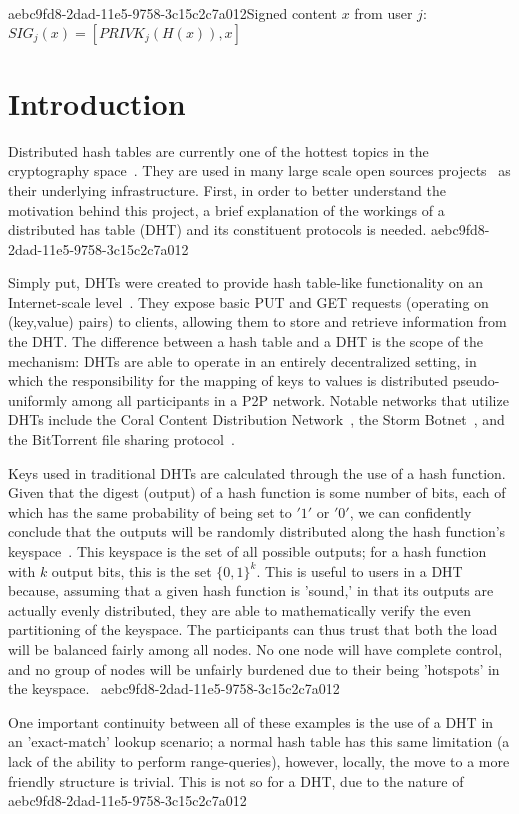 \documentclass[12pt]{article}
\begin{document}
aebc9fd8-2dad-11e5-9758-3c15c2c7a012Signed content $x$ from user $j$: $SIG_j(x) = \left[ PRIVK_j( H(x) ), x \right]$

\section{Introduction}
\par Distributed hash tables are currently one of the hottest topics in the cryptography space~\cite{Stoica:2001dj,Rowstron:2001ea,Ratnasamy:2001wn}. They are used in many large scale open sources projects~\cite{Freitas:2013tb,Xu:2010vs,Perfitt:2010fh} as their underlying infrastructure. First, in order to better understand the motivation behind this project, a brief explanation of the workings of a distributed has table (DHT) and its constituent protocols is needed.
aebc9fd8-2dad-11e5-9758-3c15c2c7a012
\par Simply put, DHTs were created to provide hash table-like functionality on an Internet-scale level~\cite{Ratnasamy:2001wn}. They expose basic PUT and GET requests (operating on (key,value) pairs) to clients, allowing them to store and retrieve information from the DHT. The difference between a hash table and a DHT is the scope of the mechanism: DHTs are able to operate in an entirely decentralized setting, in which the responsibility for the mapping of keys to values is distributed pseudo-uniformly among all participants in a P2P network. Notable networks that utilize DHTs include the Coral Content Distribution Network~\cite{Freedman:2004vb}, the Storm Botnet~\cite{Holz:2008uk}, and the BitTorrent file sharing protocol~\cite{Cohen:y1_8mBnw}.

\par Keys used in traditional DHTs are calculated through the use of a hash function. Given that the digest (output) of a hash function is some number of bits, each of which has the same probability of being set to $'1'$ or $'0'$, we can confidently conclude that the outputs will be randomly distributed along the hash function's keyspace~. This keyspace is the set of all possible outputs; for a hash function with $k$ output bits, this is the set $\{0,1\}^k$. This is useful to users in a DHT because, assuming that a given hash function is 'sound,' in that its outputs are actually evenly distributed, they are able to mathematically verify the even partitioning of the keyspace. The participants can thus trust that both the load will be balanced fairly among all nodes. No one node will have complete control, and no group of nodes will be unfairly burdened due to their being 'hotspots' in the keyspace.~
aebc9fd8-2dad-11e5-9758-3c15c2c7a012
\par One important continuity between all of these examples is the use of a DHT in an 'exact-match' lookup scenario; a normal hash table has this same limitation (a lack of the ability to perform range-queries), however, locally, the move to a more friendly structure is trivial. This is not so for a DHT, due to the nature of
aebc9fd8-2dad-11e5-9758-3c15c2c7a012\printbibliography
\end{document}
